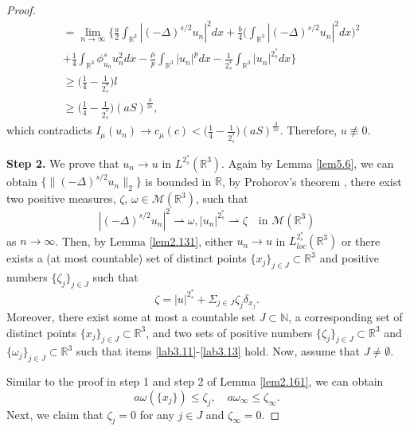 \documentclass[11pt]{article}
\numberwithin{equation}{section}
\begin{document}
\begin{proof}
\begin{align*}
&= \lim_{n\to \infty}\Big\{\frac{a}{2}\int_{\mathbb{R}^3}|(-\Delta)^{s/2}u_n|^2dx
 +\frac{b}{4}\Big(\int_{\mathbb{R}^3}|(-\Delta)^{s/2}u_n|^2dx\Big)^2 \\
&+ \frac{1}{4}\int_{\mathbb{R}^3}\phi^s_{u_n} u^2_ndx
  -\frac{\mu}{p}\int_{\mathbb{R}^3}|u_n|^pdx
  -\frac{1}{2^*_s}\int_{\mathbb{R}^3}|u_n|^{2^*_s}dx\Big\}\\
&\geq \Big(\frac{1}{4}-\frac{1}{2^*_s}\Big) l \\
&\geq \Big(\frac{1}{4}-\frac{1}{2^*_s}\Big)(aS)^{\frac{3}{2s}},
\end{align*}
which contradicts $I_\mu(u_n)\to c_\mu(c)
<\Big(\frac{1}{4}-\frac{1}{2^*_s}\Big)(aS)^{\frac{3}{2s}}$. 
Therefore, $u\not \equiv 0$.
\smallskip

\noindent\textbf{Step 2.} 
We prove that $u_n\to u$ in $L^{2^*_s}(\mathbb{R}^3)$.
Again by Lemma \ref{lem5.6}, we can obtain 
$\{\|(-\Delta)^{s/2}u_n\|_2\}$ is bounded in $\mathbb{R}$, by Prohorov's theorem 
\cite{P9899}, there exist two positive measures, $\zeta$,
 $\omega\in \mathcal{M}(\mathbb{R}^3)$, such that
\[ 
|(-\Delta)^{s/2}u_n|^2\rightharpoonup \omega, |u_n|^{2^*_s}\rightharpoonup\zeta \quad
\text{in } \mathcal{M}(\mathbb{R}^3)
\]
as $n\to \infty$. Then, by Lemma \ref{lem2.131}, either $u_n\to u$ in
$L^{2^*_s}_{loc}(\mathbb{R}^3)$ or there exists a (at most countable) set of distinct
points $\{x_j\}_{j\in J}\subset \mathbb{R}^3$ and positive numbers $\{\zeta_j\}_{j\in J}$ such that
$$
\zeta=|u|^{2^*_s}+\Sigma_{j\in J}\zeta_j \delta_{x_j}.
$$
Moreover, there exist some at most a countable set $J\subset \mathbb{N}$,
a corresponding set of distinct points $\{x_j\}_{j\in J}\subset \mathbb{R}^3$,
and two sets of positive numbers  $\{\zeta_j\}_{j\in J}\subset \mathbb{R}^3$ and
$\{\omega_j\}_{j\in J}\subset \mathbb{R}^3$ such that items
\eqref{lab3.11}-\eqref{lab3.13} hold. Now, assume that $J\neq \emptyset$.

 Similar to the proof in step 1 and step 2 of Lemma \ref{lem2.161},  we  
 can obtain
 \begin{equation}\label{4.1667}
 a\omega(\{x_j\})\leq\zeta_j,  \quad a\omega_\infty\leq\zeta_\infty.
 \end{equation}
Next, we claim that  $\zeta_j=0$ for any $j\in J$ and $\zeta_\infty=0$.


\end{proof}
\end{document}
